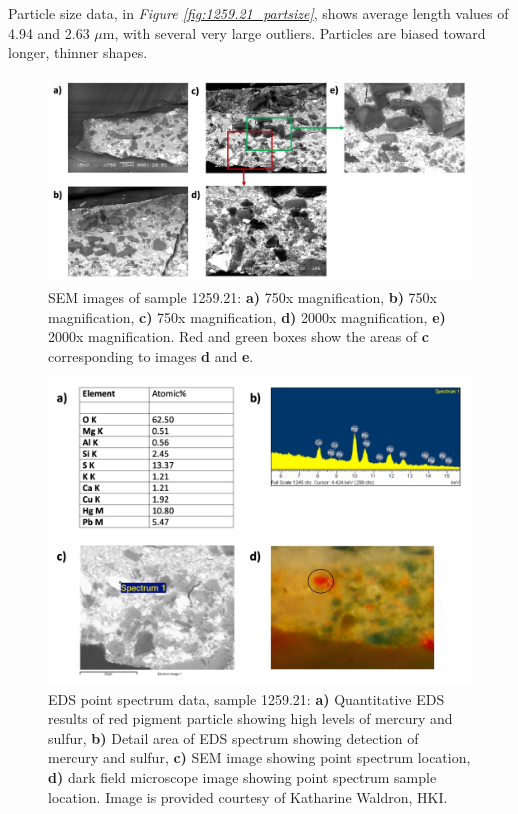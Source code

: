Particle size data, in \textit{Figure \ref{fig:1259.21_partsize}}, shows average length values of 4.94 and 2.63 $\mu$m, with several very large outliers. Particles are biased toward longer, thinner shapes.

\begin{figure}[H]
  \centering
  \includegraphics[width=\linewidth]{1259-21_imgs}
\caption[SEM images of sample 1259.21.]{SEM images of sample 1259.21: \textbf{a)} 750x magnification, \textbf{b)} 750x magnification, \textbf{c)} 750x magnification, \textbf{d)} 2000x magnification, \textbf{e)} 2000x magnification. Red and green boxes show the areas of \textbf{c} corresponding to images \textbf{d} and \textbf{e}.}
\label{fig:1259.21_imgs}
\end{figure}

\begin{figure}[H]
  \centering
  \includegraphics[width=\linewidth]{1259-21_pointspec}
\caption[EDS point spectrum data, sample 1259.21.]{EDS point spectrum data, sample 1259.21: \textbf{a)} Quantitative EDS results of red pigment particle showing high levels of mercury and sulfur, \textbf{b)} Detail area of EDS spectrum showing detection of mercury and sulfur, \textbf{c)} SEM image showing point spectrum location, \textbf{d)} dark field microscope image showing point spectrum sample location. Image is provided courtesy of Katharine Waldron, HKI.}
\label{fig:1259.21_pointspec}
\end{figure}

